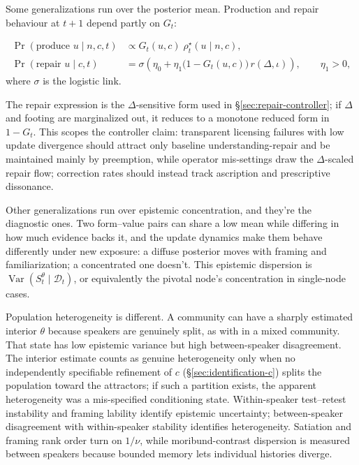 Some generalizations run over the posterior mean. Production and repair behaviour at $t+1$ depend partly on $G_t$:

\begin{align}
\Pr(\text{produce }u\mid n,c,t) &\propto
  G_t(u,c)\;\rho^{\star}_t(u\mid n,c), \\
\Pr(\text{repair }u\mid c,t) &=
  \sigma\!\left(\eta_0+\eta_1
  \bigl(1-G_t(u,c)\bigr)\,r(\Delta,\iota)\right), \qquad \eta_1>0,
\end{align}
\noindent where $\sigma$ is the logistic link.

\noindent The repair expression is the $\Delta$-sensitive form used in
\S\ref{sec:repair-controller}; if $\Delta$ and footing are marginalized out, it
reduces to a monotone reduced form in $1-G_t$. This scopes the controller claim:
transparent licensing failures with low update divergence should attract only
baseline understanding-repair and be maintained mainly by preemption, while
operator mis-settings draw the $\Delta$-scaled repair flow; correction rates
should instead track ascription and prescriptive dissonance.

Other generalizations run over epistemic concentration, and they're the
diagnostic ones. Two form--value pairs can share a low mean while differing in
how much evidence backs it, and the update dynamics make them behave differently
under new exposure: a diffuse posterior moves with framing and familiarization;
a concentrated one doesn't. This epistemic dispersion is
$\operatorname{Var}(S_t^{\theta}\mid\mathcal{D}_t)$, or equivalently the
pivotal node's concentration in single-node cases.

Population heterogeneity is different. A community can have a sharply estimated
interior $\theta$ because speakers are genuinely split, as with  in a mixed community. That state has low epistemic variance but high
between-speaker disagreement. The interior estimate counts as genuine
heterogeneity only when no independently specifiable refinement of $c$
(\S\ref{sec:identification-c}) splits the population toward the attractors; if
such a partition exists, the apparent heterogeneity was a mis-specified
conditioning state. Within-speaker test--retest instability and
framing lability identify epistemic uncertainty; between-speaker disagreement
with within-speaker stability identifies heterogeneity. Satiation and framing
rank order turn on $1/\nu$, while
moribund-contrast dispersion is measured between speakers because bounded memory
lets individual histories diverge.

